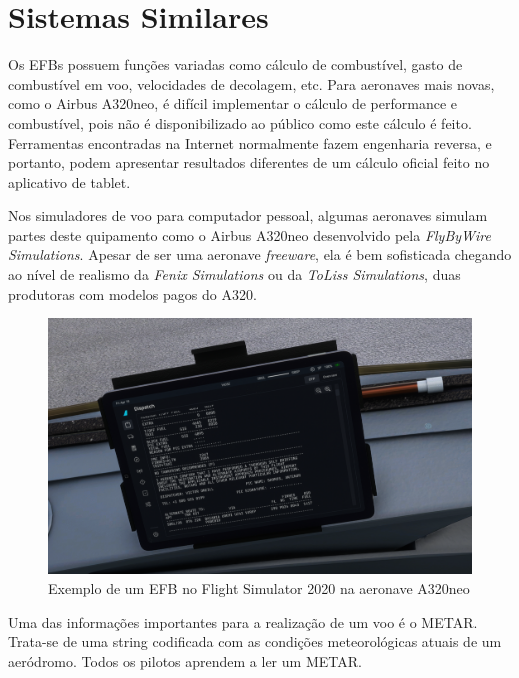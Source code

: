 \chapter{Sistemas Similares}
Os EFBs possuem funções variadas como cálculo de combustível, gasto de combustível
em voo, velocidades de decolagem, etc. Para aeronaves mais novas, como o Airbus 
A320neo, é difícil implementar o cálculo de performance e combustível, pois não 
é disponibilizado ao público como este cálculo é feito. Ferramentas encontradas 
na Internet \cite{a320-perf} normalmente fazem engenharia reversa, e portanto, 
podem apresentar resultados diferentes de um cálculo oficial feito no aplicativo
de tablet.

Nos simuladores de voo para computador pessoal, algumas aeronaves simulam partes
deste quipamento como o Airbus A320neo desenvolvido pela \textit{FlyByWire Simulations}. 
Apesar de ser uma aeronave \textit{freeware}, ela é bem sofisticada chegando ao 
nível de realismo da \textit{Fenix Simulations} ou da \textit{ToLiss Simulations}, 
duas produtoras com modelos pagos do A320.

\begin{figure}[ht]
    \begin{center}
    \includegraphics[width=400pt]{img/efb-a320.png}
    \caption{Exemplo de um EFB no Flight Simulator 2020 na aeronave A320neo}
    \label{fig:efb-a320}
    \end{center}
\end{figure}

Uma das informações importantes para a realização de um voo é o METAR. Trata-se 
de uma string codificada com as condições meteorológicas atuais de um aeródromo. 
Todos os pilotos aprendem a ler um METAR.

